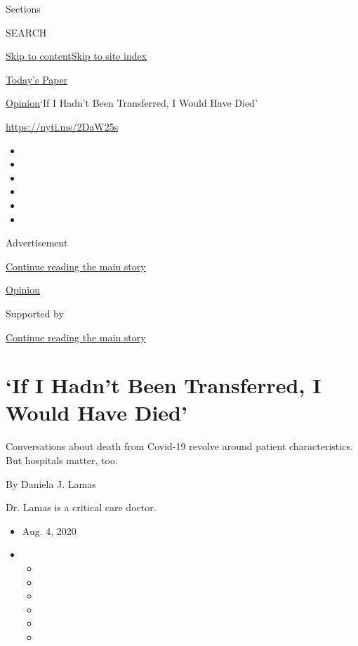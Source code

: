Sections

SEARCH

\protect\hyperlink{site-content}{Skip to
content}\protect\hyperlink{site-index}{Skip to site index}

\href{https://myaccount.nytimes3xbfgragh.onion/auth/login?response_type=cookie\&client_id=vi}{}

\href{https://www.nytimes3xbfgragh.onion/section/todayspaper}{Today's
Paper}

\href{/section/opinion}{Opinion}\textbar{}`If I Hadn't Been Transferred,
I Would Have Died'

\url{https://nyti.ms/2DaW25s}

\begin{itemize}
\item
\item
\item
\item
\item
\item
\end{itemize}

Advertisement

\protect\hyperlink{after-top}{Continue reading the main story}

\href{/section/opinion}{Opinion}

Supported by

\protect\hyperlink{after-sponsor}{Continue reading the main story}

\hypertarget{if-i-hadnt-been-transferred-i-would-have-died}{%
\section{`If I Hadn't Been Transferred, I Would Have
Died'}\label{if-i-hadnt-been-transferred-i-would-have-died}}

Conversations about death from Covid-19 revolve around patient
characteristics. But hospitals matter, too.

By Daniela J. Lamas

Dr. Lamas is a critical care doctor.

\begin{itemize}
\item
  Aug. 4, 2020
\item
  \begin{itemize}
  \item
  \item
  \item
  \item
  \item
  \item
  \end{itemize}
\end{itemize}

